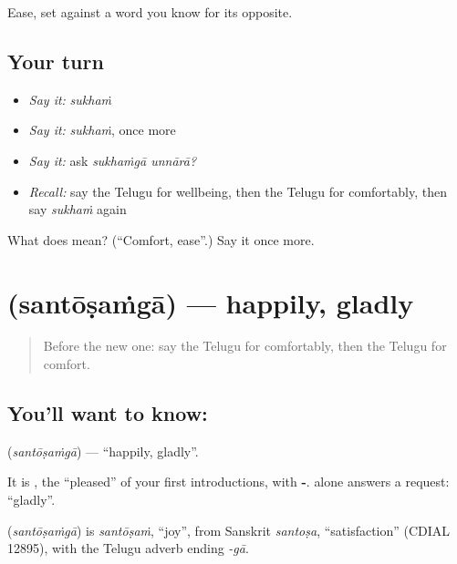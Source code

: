 \begin{grammarlens}[title={What you've built}]
Ease, set against a word you know for its opposite.
\end{grammarlens}

\subsection*{Your turn}
\begin{itemize}
\raggedright
  \item \emph{Say it:} \emph{sukhaṁ}
  \item \emph{Say it:} \emph{sukhaṁ}, once more
  \item \emph{Say it:} ask \emph{sukhaṁgā unnārā?}
  \item \emph{Recall:} say the Telugu for wellbeing, then the Telugu for comfortably, then say \emph{sukhaṁ} again
\end{itemize}

\begin{tcolorbox}[breakable,colback=teal!4,colframe=teal!35!black,title={Before you move on}]
What does  mean? (\textquotedblleft{}Comfort, ease\textquotedblright{}.) Say it once more.
\end{tcolorbox}
\section[\texorpdfstring{\te{సంతోషంగా} (santōṣaṁgā)}{సంతోషంగా (santōṣaṁgā)}]{ (santōṣaṁgā) — happily, gladly}

\label{lesson:TE-C93-gladly}



\begin{quote}
Before the new one: say the Telugu for comfortably, then the Telugu for comfort.
\end{quote}

\subsection*{You'll want to know: }
\textbf{} (\emph{santōṣaṁgā}) — \textquotedblleft{}happily, gladly\textquotedblright{}.

It is \textbf{}, the \textquotedblleft{}pleased\textquotedblright{} of your first introductions, with \textbf{-}. \textbf{} alone answers a request: \textquotedblleft{}gladly\textquotedblright{}.

\begin{cousinweb}
\textbf{} (\emph{santōṣaṁgā}) is \emph{santōṣaṁ}, \textquotedblleft{}joy\textquotedblright{}, from Sanskrit \emph{santoṣa}, \textquotedblleft{}satisfaction\textquotedblright{} (CDIAL 12895), with the Telugu adverb ending \emph{-gā}.
\end{cousinweb}

